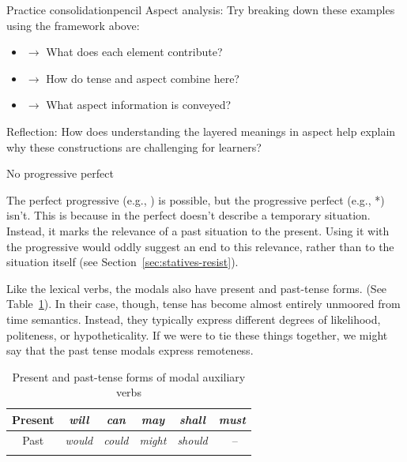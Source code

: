 \begin{tblsframedsymbol}{Practice consolidation}{pencil}
Aspect analysis: Try breaking down these examples using the framework above:
\begin{itemize}[noitemsep, leftmargin=*]
    \item {} $\rightarrow$ What does each element contribute?
    \item {} $\rightarrow$ How do tense and aspect combine here?
    \item {} $\rightarrow$ What aspect information is conveyed?
\end{itemize}
Reflection: How does understanding the layered meanings in aspect help explain why these constructions are challenging for learners?
\end{tblsframedsymbol}

\begin{tblsframed}{No progressive perfect}


The perfect progressive (e.g., ) is possible, but the progressive perfect (e.g., *) isn't. This is because  in the perfect doesn't describe a temporary situation. Instead, it marks the relevance of a past situation to the present. Using it with the progressive would oddly suggest an end to this relevance, rather than to the situation itself (see Section~\ref{sec:statives-resist}).
\end{tblsframed}

Like the lexical verbs, the modals also have present and past-tense forms. (See Table~\ref{tab:modal-auxiliary-forms-tense}). In their case, though, tense has become almost entirely unmoored from time semantics. Instead, they typically express different degrees of likelihood, politeness, or hypotheticality. If we were to tie these things together, we might say that the past tense modals express remoteness.

\begin{table}
    \begin{tabular}{cccccc}
        \lsptoprule
        Present & \textit{will} & \textit{can} & \textit{may} & \textit{shall} & \textit{must} \\
        \midrule
        Past & \textit{would} & \textit{could} & \textit{might} & \textit{should} &~-- \\
        \lspbottomrule
    \end{tabular}
    \caption{Present and past-tense forms of modal auxiliary verbs}
    \label{tab:modal-auxiliary-forms-tense}
\end{table}

